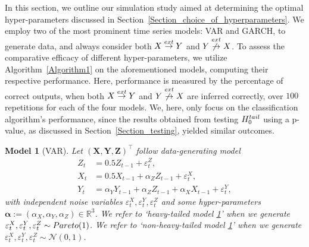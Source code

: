 \documentclass[a4paper,11pt]{article}
\newtheorem{model}{Model}
\newcommand{\toverset}[2]{\overset{{\rm #1}}{#2}}
\begin{document}
In this section, we outline our simulation study aimed at determining the optimal hyper-parameters discussed in Section~\ref{Section_choice_of_hyperparameters}. We employ two of the most prominent time series models: VAR and GARCH, to generate data, and always consider both $\textbf{X}\toverset{ext}{\to}\textbf{Y}$ and $\textbf{Y}\toverset{ext}{\not\to}\textbf{X}$. 
To assess the comparative efficacy of different hyper-parameters, we utilize Algorithm~\ref{Algorithm1} on the aforementioned models, computing their respective performance. Here, performance is measured by the percentage of correct outputs, when both $\textbf{X}\toverset{ext}{\to}\textbf{Y}$ and $\textbf{Y}\toverset{ext}{\not\to}\textbf{X}$ are inferred correctly, over $100$ repetitions for each of the four models. 
We, here, only focus on the classification algorithm's performance, since the results obtained from testing $H_0^{\rm tail}$ using a p-value, as discussed in Section~\ref{Section_testing}, yielded similar outcomes.



\begin{model}[VAR]
\label{VAR_time_series_definition}
Let $(\mathbf{X,Y,Z})^\top$ follow data-generating model
\begin{align*}
Z_t&=0.5Z_{t-1}+\varepsilon_t^Z,\\
X_t&=0.5X_{t-1}+ \alpha_Z Z_{t-1}+\varepsilon_t^X,\\
Y_t&=\alpha_YY_{t-1}+ \alpha_ZZ_{t-1}+ \alpha_X X_{t-1}+\varepsilon_t^Y,
\end{align*}
with independent noise variables $\varepsilon_t^X,  \varepsilon_t^Y, \varepsilon_t^Z$ and some hyper-parameters $\boldsymbol{\alpha}:=(\alpha_X, \alpha_Y, \alpha_Z)\in\mathbb{R}^3$. We refer to `heavy-tailed model \ref{VAR_time_series_definition}' when we generate  $\varepsilon_t^X,  \varepsilon_t^Y, \varepsilon_t^Z\sim {\rm Pareto}(1)$. We refer to `non-heavy-tailed model \ref{VAR_time_series_definition}' when we generate  $\varepsilon_t^X,  \varepsilon_t^Y, \varepsilon_t^Z\sim \mathcal{N}(0,1)$. 
\end{model}
\end{document}
